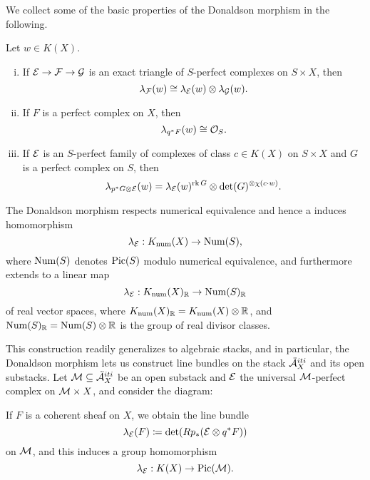 We collect some of the basic properties of the Donaldson morphism in the following.
\begin{lem}\label{Donaldsonproperties}
    Let $w \in K(X)$.
    \begin{enumerate}[(i)]
        \item If $\mathcal{E} \to \mathcal{F} \to \mathcal{G}$ is an exact triangle of $S$-perfect complexes on $S \times X$, then
        \[ \lambda_{\mathcal{F}}(w) \cong \lambda_{\mathcal{E}}(w) \otimes \lambda_{\mathcal{G}}(w). \]
        
        \item If $F$ is a perfect complex on $X$, then
        \[ \lambda_{q^*F}(w) \cong \mathcal{O}_S. \]
        
        \item If $\mathcal{E}$ is an $S$-perfect family of complexes of class $c \in K(X)$ on $S \times X$ and $G$ is a perfect complex on $S$, then
        \[ \lambda_{p^*G \otimes \mathcal{E}}(w) = \lambda_{\mathcal{E}}(w)^{\operatorname{\mathrm{rk}} G} \otimes \det(G)^{\otimes \chi(c\cdot w)}. \]
    \end{enumerate}
\end{lem}

The Donaldson morphism respects numerical equivalence and hence a induces homomorphism
\[ \lambda_{\mathcal{E}}: K_{\mathrm{num}}(X) \to \mathrm{Num}(S), \]
where $\mathrm{Num}(S)$ denotes $\mathrm{Pic}(S)$ modulo numerical equivalence, and furthermore extends to a linear map
\[ \lambda_{\mathcal{E}}: K_{\mathrm{num}}(X)_{\mathbb{R}} \to \mathrm{Num}(S)_{\mathbb{R}} \]
of real vector spaces, where $K_{\mathrm{num}}(X)_{\mathbb{R}} = K_{\mathrm{num}}(X) \otimes \mathbb{R}$, and $\mathrm{Num}(S)_{\mathbb{R}} = \mathrm{Num}(S) \otimes \mathbb{R}$ is the group of real divisor classes.

This construction readily generalizes to algebraic stacks, and in particular, the Donaldson morphism lets us construct line bundles on the stack $\ddot{\mathcal{A}}^{iti}_X$ and its open substacks. Let $\mathcal{M} \subseteq \ddot{\mathcal{A}}^{iti}_X$ be an open substack and $\mathcal{E}$ the universal $\mathcal{M}$-perfect complex on $\mathcal{M} \times X$, and consider the diagram:
\begin{center}
\end{center}
If $F$ is a coherent sheaf on $X$, we obtain the line bundle
\[ \lambda_{\mathcal{E}}(F) \coloneqq \det(R p_*(\mathcal{E} \otimes q^*F)) \]
on $\mathcal{M}$, and this induces a group homomorphism
\[ \lambda_{\mathcal{E}}: K(X) \to \mathrm{Pic}(\mathcal{M}). \]


